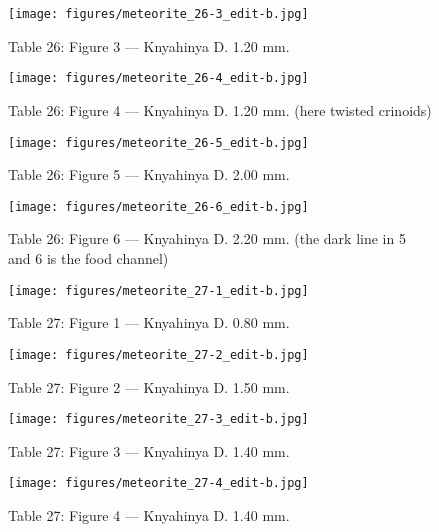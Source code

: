 \documentclass[a4paper, 12pt, oneside]{article}
\begin{document}
\clearpage
\begin{figure}[t]
\texttt{[image: figures/meteorite\_26-3\_edit-b.jpg]}
\caption{Table 26: Figure 3 --- Knyahinya D. 1.20 mm.}
\centering
\end{figure}
\clearpage
\begin{figure}[t]
\texttt{[image: figures/meteorite\_26-4\_edit-b.jpg]}
\caption{Table 26: Figure 4 --- Knyahinya D. 1.20 mm. (here twisted crinoids)}
\centering
\end{figure}
\clearpage
\begin{figure}[t]
\texttt{[image: figures/meteorite\_26-5\_edit-b.jpg]}
\caption{Table 26: Figure 5 --- Knyahinya D. 2.00 mm.}
\centering
\end{figure}
\clearpage
\begin{figure}[t]
\texttt{[image: figures/meteorite\_26-6\_edit-b.jpg]}
\caption{Table 26: Figure 6 --- Knyahinya D. 2.20 mm. (the dark line in 5 and 6 is the food channel)}
\centering
\end{figure}
\clearpage
{}
\begin{figure}[t]
\texttt{[image: figures/meteorite\_27-1\_edit-b.jpg]}
\caption{Table 27: Figure 1 --- Knyahinya D. 0.80 mm.}
\centering
\end{figure}
\clearpage
\begin{figure}[t]
\texttt{[image: figures/meteorite\_27-2\_edit-b.jpg]}
\caption{Table 27: Figure 2 --- Knyahinya D. 1.50 mm.}
\centering
\end{figure}
\clearpage
\begin{figure}[t]
\texttt{[image: figures/meteorite\_27-3\_edit-b.jpg]}
\caption{Table 27: Figure 3 --- Knyahinya D. 1.40 mm.}
\centering
\end{figure}
\clearpage
\begin{figure}[t]
\texttt{[image: figures/meteorite\_27-4\_edit-b.jpg]}
\caption{Table 27: Figure 4 --- Knyahinya D. 1.40 mm.}
\centering
\end{figure}
\end{document}
